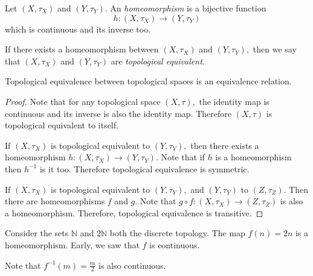 \documentclass[
	fontsize=10pt, %
	twoside=false, %
	secnumdepth=1, %
]{kaobook}
\begin{document}
\begin{definition}
Let $(X,\tau_X)$ and $(Y,\tau_Y).$ An \emph{homeomorphism} is a bijective function $$h:(X,\tau_X)\to (Y,\tau_Y)$$ which is continuous and its inverse too.

If there exists a homeomorphism between $(X,\tau_X)$ and $(Y,\tau_Y),$ then we say that $(X,\tau_X)$ and $(Y,\tau_Y)$ are \emph{topological equivalent}.
\end{definition}

\begin{proposition}
Topological equivalence between topological spaces is an equivalence relation.
\end{proposition}
\begin{proof}
Note that for any topological space $(X,\tau),$ the identity map is continuous and its inverse is also the identity map. Therefore $(X,\tau)$ is topological equivalent to itself.

If $(X,\tau_X)$ is topological equivalent to $(Y,\tau_Y),$ then there exists a homeomorphism  $h:(X,\tau_X)\to (Y,\tau_Y).$ Note that if $h$ is a homeomorphism then $h^{-1}$ is it too. Therefore topological equivalence is symmetric.

If $(X,\tau_X)$ is topological equivalent to $(Y,\tau_Y),$ and $(Y,\tau_Y)$ to $(Z,\tau_Z).$ Then there are homeomorphisms $f$ and $g.$ Note that $g\circ f:(X,\tau_X)\to(Z,\tau_Z)$ is also a homeomorphism. Therefore, topological equivalence is transitive.
\end{proof}

\begin{example}
Consider the sets $\mathbb{N}$ and $2\mathbb{N}$ both the discrete topology. The map $f(n)=2n$ is a homeomorphism. Early, we saw that $f$ is continuous. 

Note that $f^{-1}(m)=\frac{m}{2}$ is also continuous.
\end{example}

%
%
%


\end{document}
